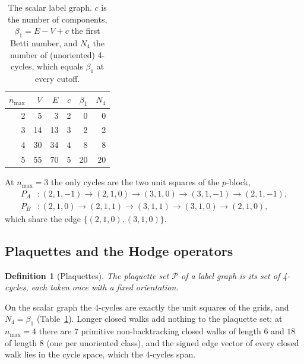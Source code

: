 \documentclass[11pt]{article}
\newtheorem{definition}{Definition}
\begin{document}
\begin{table}[t]
\centering
\caption{The scalar label graph.  $c$ is the number of components,
$\beta_1=E-V+c$ the first Betti number, and $N_4$ the number of
(unoriented) 4-cycles, which equals $\beta_1$ at every cutoff.}
\label{tab:scalar_counts}
\begin{tabular}{rrrrrr}
\toprule
$n_{\max}$ & $V$ & $E$ & $c$ & $\beta_1$ & $N_4$ \\
\midrule
2 & 5  & 3  & 2 & 0  & 0  \\
3 & 14 & 13 & 3 & 2  & 2  \\
4 & 30 & 34 & 4 & 8  & 8  \\
5 & 55 & 70 & 5 & 20 & 20 \\
\bottomrule
\end{tabular}
\end{table}

At $n_{\max}=3$ the only cycles are the two unit squares of the $p$-block,
\begin{align}
P_A &: (2,1,-1)\to(2,1,0)\to(3,1,0)\to(3,1,-1)\to(2,1,-1),\nonumber\\
P_B &: (2,1,0)\to(2,1,1)\to(3,1,1)\to(3,1,0)\to(2,1,0),
\label{eq:p_block_plaquettes}
\end{align}
which share the edge $\{(2,1,0),(3,1,0)\}$.

\subsection{Plaquettes and the Hodge operators}
\label{sec:hodge}

\begin{definition}[Plaquettes]
\label{def:plaquettes}
The plaquette set $\mathcal{P}$ of a label graph is its set of 4-cycles,
each taken once with a fixed orientation.
\end{definition}

On the scalar graph the 4-cycles are exactly the unit squares of the grids,
and $N_4=\beta_1$ (Table~\ref{tab:scalar_counts}).  Longer closed walks add
nothing to the plaquette set: at $n_{\max}=4$ there are $7$ primitive
non-backtracking closed walks of length $6$ and $18$ of length $8$ (one per
unoriented class), and the signed edge vector of every closed walk lies in
the cycle space, which the 4-cycles span.
\end{document}
